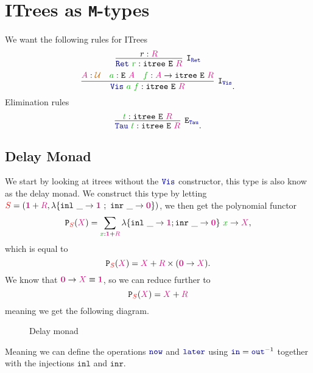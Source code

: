\documentclass[twoside,11pt,openright]{report}
\theoremstyle{plain} %
\theoremstyle{definition}
\theoremstyle{remark}
\newcommand*{\term}[1]{\textcolor{green!70!black}{#1}} %
\newcommand*{\type}[1]{\textcolor{magenta!90!black}{#1}}
\newcommand*{\container}[1]{\textcolor{red}{#1}}
\newcommand*{\universe}[1]{\textcolor{orange!80!black}{#1}}
\newcommand*{\unit}{\type{\textbf{1}}}
\newcommand*{\empt}{\type{\textbf{0}}}
\newcommand*{\function}[1]{\textcolor{blue!60!black}{\ensuremath{\mathtt{#1}}}}
\newcommand*{\typeformer}[1]{\ensuremath{\mathtt{#1}}}
\newcommand*{\functor}[1]{\ensuremath{\mathbf{\mathtt{#1}}}}
\begin{document}
\section{ITrees as \texttt{M}-types}
We want the following rules for ITrees
\begin{equation}
  \infer[\mathtt{I}_{\function{Ret}}]{\function{Ret}~\term{r} : \typeformer{itree}~\typeformer{E}~\type{R}}{r : \type{R}}
\end{equation}
\begin{equation}
  \infer[\mathtt{I}_{\function{Vis}}]{\function{Vis}~\term{a}~\term{f} : \typeformer{itree}~\typeformer{E}~\type{R}}{\type{A} : \universe{\mathcal{U}} & \term{a} : \typeformer{E}~\type{A} & \term{f} : \type{A} \rightarrow \typeformer{itree}~\typeformer{E}~\type{R}}.
\end{equation}
Elimination rules
\begin{equation}
  \infer[\mathtt{E}_{\function{Tau}}]{\function{Tau}~\term{t} : \typeformer{itree}~\typeformer{E}~\type{R}}{\term{t} : \typeformer{itree}~\typeformer{E}~\type{R}}.
\end{equation}

\subsection{Delay Monad}
We start by looking at itrees without the \(\function{Vis}\) constructor, this type is also know as the delay monad. We construct this type by letting \(\container{S} = (\unit + \type{R},\lambda \{ \texttt{inl}~\_ \rightarrow \unit~;~\texttt{inr}~\_ \rightarrow \empt \})\), we then get the polynomial functor
\begin{equation}
  \functor{P}_{\container{S}}(\type{X}) = \sum_{\term{x} : \unit + \type{R}} \lambda \{ \texttt{inl}~\_ \rightarrow \unit ; \texttt{inr}~\_ \rightarrow \empt\}~\term{x} \rightarrow \type{X},
\end{equation}
which is equal to
\begin{equation}
  \functor{P}_{\container{S}}(\type{X}) = \type{X} + \type{R} \times (\empt \rightarrow \type{X}).
\end{equation}
We know that \(\empt \rightarrow \type{X} \equiv \unit\), so we can reduce further to
\begin{equation}
  \functor{P}_{\container{S}}(\type{X}) = \type{X} + \type{R}
\end{equation}
meaning we get the following diagram.

\begin{figure}[h]
  \centering
  \caption{Delay monad}
\end{figure}
\noindent Meaning we can define the operations \(\function{now}\) and \(\function{later}\) using \(\function{in} = \function{out}^{-1}\) together with the injections \(\mathtt{inl}\) and \(\mathtt{inr}\). 
\end{document}
